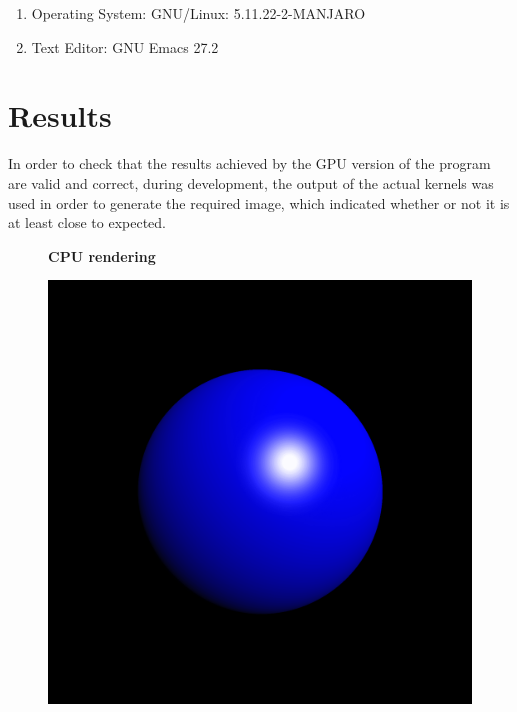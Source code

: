 \documentclass[english]{exam}
\begin{document}
\begin{enumerate}
\item Operating System: GNU/Linux: 5.11.22-2-MANJARO
\item Text Editor: GNU Emacs 27.2
\end{enumerate}

\section*{Results}

In order to check that the results achieved by the GPU version of the program are valid and correct, during development, the output of the actual kernels was used in order to generate the required image, which indicated whether or not it is at least close to expected.

\begin{figure}[H]
    \centering
    \textbf{CPU rendering}\par\medskip
    \includegraphics[scale=0.4]{cpu.png}
    \caption{}
\end{figure}
\end{document}

